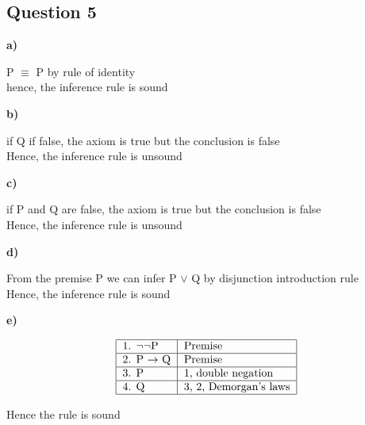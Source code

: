 \documentclass[11pt]{article}
\begin{document}
{\subsection*{Question 5}

\noindent
\textbf{a)} 

P $\equiv$ P by rule of identity\\
\indent
hence, the inference rule is sound
\parskip 6mm

\noindent
\textbf{b)} 

if Q if false, the axiom is true but the conclusion is false\\
\indent
Hence, the inference rule is unsound

\noindent
\textbf{c)} 

if P and Q are false, the axiom is true but the conclusion is false\\
\indent
Hence, the inference rule is unsound

\noindent
\textbf{d)} 

From the premise P we can infer P $\lor$ Q by disjunction introduction rule\\
\indent
Hence, the inference rule is sound

\pagebreak
\noindent
\textbf{e)} 

\setlength{\tabcolsep}{1em} %
{\renewcommand{\arraystretch}{1.5}%
\begin{displaymath}
    \begin{tabular}{| l | l |}
        \hline
        1. $\neg$$\neg$P & Premise \\
        \hline
        2. P $\rightarrow$ Q & Premise \\
        \hline
        3. P & 1, double negation \\
        \hline
        4. Q & 3, 2, Demorgan's laws\\
        \hline
    \end{tabular}
\end{displaymath}

Hence the rule is sound

}}
\end{document}

